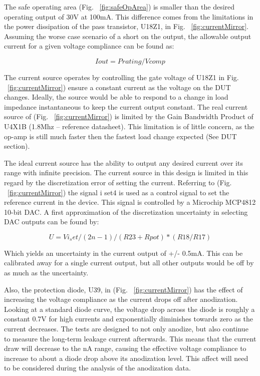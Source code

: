 \documentclass[journal]{IEEEtran}
\begin{document}
The safe operating area (Fig.  ~\ref{fig:safeOpArea}) is smaller than the desired operating output of 30V at 100mA. This difference comes from the limitations in the power dissipation of the pass transistor, U18Z1, in Fig. ~\ref{fig:currentMirror}. Assuming the worse case scenario of a short on the output, the allowable output current for a given voltage compliance can be found as:

\begin{equation}
Iout = Prating / Vcomp
\end{equation}

The current source operates by controlling the gate voltage of U18Z1 in Fig. ~\ref{fig:currentMirror}) ensure a constant current as the voltage on the DUT changes. Ideally, the source would be able to respond to a change in load impedance instantaneous to keep the current output constant. The real current source of (Fig. ~\ref{fig:currentMirror}) is limited by the Gain Bandwidth Product of U4X1B (1.8Mhz – reference datasheet). This limitation is of little concern, as the op-amp is still much faster then the fastest load change expected (See DUT section).

The ideal current source has the ability to output any desired current over its range with infinite precision. The current source in this design is limited in this regard by the discretization error of setting the current. Referring to (Fig. ~\ref{fig:currentMirror}) the signal i set4 is used as a control signal to set the reference current in the device. This signal is controlled by a Microchip MCP4812 10-bit DAC. A first approximation of the discretization uncertainty in selecting DAC outputs can be found by:


\begin{equation}
U = Vi_set /(2n-1) / (R23 + Rpot) *(R18/R17)
\end{equation}


Which yields an uncertainty in the current output of +/- 0.5mA. This can be calibrated away for a single current output, but all other outputs would be off by as much as the uncertainty.

Also, the protection diode, U39, in (Fig. ~\ref{fig:currentMirror}) has the effect of increasing the voltage compliance as the current drops off after anodization. Looking at a standard diode curve, the voltage drop across the diode is roughly a constant 0.7V for high currents and exponentially diminishes towards zero as the current decreases. The tests are designed to not only anodize, but also continue to measure the long-term leakage current afterwards. This means that the current draw will decrease to the nA range, causing the effective voltage compliance to increase to about a diode drop above its anodization level. This affect will need to be considered during the analysis of the anodization data.
\end{document}
